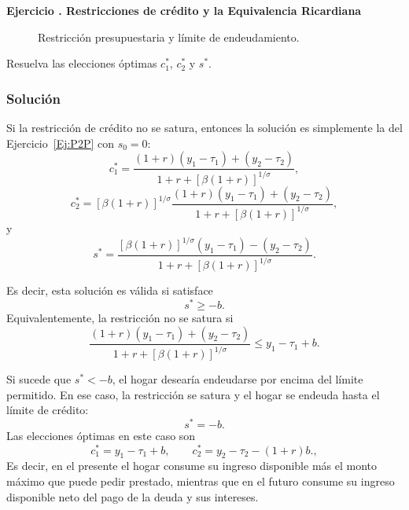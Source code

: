 \documentclass[11pt]{article}
\let\enumerateoriginal\enumerate
\let\endenumerateoriginal\endenumerate
\renewenvironment{enumerate}{%
  \enumerateoriginal
  \setlength{\itemsep}{0.5em}%
  \setlength{\parsep}{0pt}%
  \setlength{\topsep}{0.4em}%
}{\endenumerateoriginal}
\newcounter{problema}
\newenvironment{problema}[1]{%
  \par
  \refstepcounter{problema}%
  \addvspace{0.9em}%
  \noindent\textbf{Ejercicio \theproblema. #1}
  \par\nobreak\smallskip
}{\par}
\begin{document}
\begin{problema}{Restricciones de crédito y la Equivalencia Ricardiana}
\begin{enumerate}
\begin{figure}[htbp]
\caption{Restricción presupuestaria y límite de endeudamiento.}
\end{figure}

\item Resuelva las elecciones óptimas \(c_1^*\), \(c_2^*\) y \(s^*\).

\subsubsection*{Solución}
 Si la restricción de crédito no se satura, entonces la solución es simplemente la del Ejercicio~\ref{Ej:P2P} con $s_0 = 0$:
\[
  c_1^*
  =
  \frac{(1+r)(y_1-\tau_1)+(y_2-\tau_2)}
  {1+r+\left[\beta(1+r)\right]^{1/\sigma}},
\]
\[
  c_2^*
  =
  \left[\beta(1+r)\right]^{1/\sigma}
  \frac{(1+r)(y_1-\tau_1)+(y_2-\tau_2)}
  {1+r+\left[\beta(1+r)\right]^{1/\sigma}},
\]
y
\[
  s^*
  =
  \frac{
  \left[\beta(1+r)\right]^{1/\sigma}(y_1-\tau_1)
  -(y_2-\tau_2)}
  {1+r+\left[\beta(1+r)\right]^{1/\sigma}}.
\]

Es decir, esta solución es válida si satisface
\[
  s^*\geq-b.
\]
Equivalentemente, la restricción no se satura si
\[
  \frac{(1+r)(y_1-\tau_1)+(y_2-\tau_2)}
  {1+r+\left[\beta(1+r)\right]^{1/\sigma}}
  \leq
  y_1-\tau_1+b.
\]

Si sucede que $s^* < -b$, el hogar desearía endeudarse por encima del límite permitido. En ese caso, la restricción se satura y el hogar se endeuda hasta el límite de crédito:
\[
  \boxed{
  s^*=-b.
  }
\]
Las elecciones óptimas en este caso son
\[
  \boxed{
    c_1^*=y_1-\tau_1+b,
    \qquad
    c_2^*=y_2-\tau_2-(1+r)b.
  },
\]
Es decir, en el presente el hogar consume su ingreso disponible más el monto máximo que puede pedir prestado, mientras que en el futuro consume su ingreso disponible neto del pago de la deuda y sus intereses.



\end{enumerate}
\end{problema}
\end{document}
